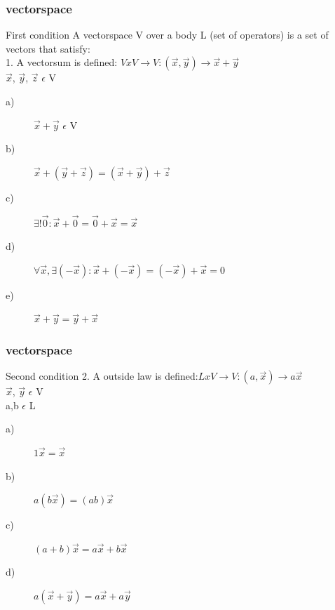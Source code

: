 \begin{frame}
	\frametitle{vectorspace}
	\begin{block}{First condition}
		A vectorspace V over a body L (set of operators) is a set of vectors that satisfy:\\
		1. A vectorsum is defined: $VxV\rightarrow V:(\overrightarrow{x},\overrightarrow{y})\rightarrow\overrightarrow{x}+\overrightarrow{y}$\\
		 \hspace{1.5 cm}$\overrightarrow{x}$, $\overrightarrow{y}$, $\overrightarrow{z}$ $\epsilon$ V
		\begin{description}
			\item[a)] $\overrightarrow{x}+\overrightarrow{y}$ $\epsilon$ V
			\item[b)] $\overrightarrow{x}+(\overrightarrow{y}+\overrightarrow{z})=(\overrightarrow{x}+\overrightarrow{y})+\overrightarrow{z}$
			\item[c)] $\exists!\overrightarrow{0}: \overrightarrow{x}+\overrightarrow{0}=\overrightarrow{0}+\overrightarrow{x}=\overrightarrow{x}$
			\item[d)] $\forall \overrightarrow{x}, \exists (-\overrightarrow{x}):\overrightarrow{x}+(-\overrightarrow{x})=(-\overrightarrow{x})+\overrightarrow{x}=0$
			\item[e)] $\overrightarrow{x}+\overrightarrow{y}=\overrightarrow{y}+\overrightarrow{x}$
		\end{description}
	\end{block}
\end{frame}

\begin{frame}
	\frametitle{vectorspace}
	\begin{block}{Second condition}
		2. A outside law is defined:$LxV\rightarrow V:(a,\overrightarrow{x})\rightarrow a\overrightarrow{x}$\\
		\hspace{1.5 cm}$\overrightarrow{x}$, $\overrightarrow{y}$ $\epsilon$ V\\
		\hspace{1.5 cm}a,b $\epsilon$ L
		\begin{description}
			\item[a)] $1\overrightarrow{x}=\overrightarrow{x}$
			\item[b)] $a(b\overrightarrow{x})=(ab)\overrightarrow{x}$
			\item[c)] $(a+b)\overrightarrow{x}=a\overrightarrow{x}+b\overrightarrow{x}$
			\item[d)] $a(\overrightarrow{x}+\overrightarrow{y})=a\overrightarrow{x}+a\overrightarrow{y}$
		\end{description}
	\end{block} 
\end{frame}

